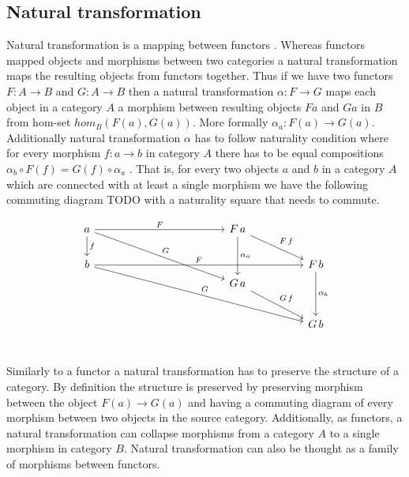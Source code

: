 \documentclass[article]{aaltoseries}
\begin{document}
  \subsection{Natural transformation}
    Natural transformation is a mapping between functors \cite{computational,
      barr1990category, mac2013categories}. Whereas functors mapped objects and
    morphisms between two categories a natural transformation maps the resulting
    objects from functors together. Thus if we have two functors $F: A
    \rightarrow B$ and $G: A \rightarrow B$ then a natural transformation
    $\alpha: F \rightarrow G$ maps each object in a category $A$ a morphism
    between resulting objects $F a$ and $G a$ in $B$ from hom-set $hom_B(F(a),
    G(a))$. More formally $\alpha_a: F(a) \rightarrow G(a)$. Additionally
    natural transformation $\alpha$ has to follow naturality condition where for
    every morphism $f: a \rightarrow b$ in category $A$ there has to be equal
    compositions $\alpha_b \circ F(f) = G(f) \circ \alpha_a$
    \cite{barr1990category, computational, eilenberg1945general}. That is, for
    every two objects $a$ and $b$ in a category $A$ which are connected with at
    least a single morphism we have the following commuting diagram TODO with a
    naturality square that needs to commute.
    
    \[
      \begin{tikzcd}[column sep=huge]
        a \arrow[r, "F"] \arrow[d, "f"] \arrow[ddr, "G"]
        &[7em] F\, a \arrow[dd, "\alpha_a"] \arrow[dr, "F\, f"]
        & \\
        b \arrow[rr, "F"] \arrow[ddrr, "G"]
        &
        & F\, b \arrow[dd, "\alpha_b"] \\
        [-1.5em]
        & G\, a \arrow[dr, "G\, f"]
        & \\
        [0.5em]
        &
        & G\, b \\
      \end{tikzcd}
    \]

    Similarly to a functor a natural transformation has to preserve the
    structure of a category. By definition the structure is preserved by
    preserving morphism between the object $F(a) \rightarrow G(a)$ and having a
    commuting diagram of every morphism between two objects in the source
    category. Additionally, as functors, a natural transformation can collapse
    morphisms from a category $A$ to a single morphism in category $B$. Natural
    transformation can also be thought as a family of morphisms between functors.
 
\end{document}
